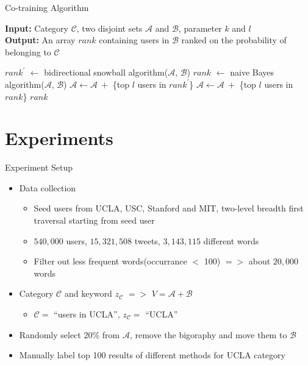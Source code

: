 \documentclass{beamer}
\begin{document}
\begin{frame}{Co-training Algorithm}
\begin{algorithm}[H]
\caption{\textsc{Co-training}}
\textbf{Input: }{Category $\mathcal{C}$, two disjoint sets $\mathcal{A}$ and $\mathcal{B}$, parameter $k$ and $l$}\\
\textbf{Output: }{An array $rank$ containing users in $\mathcal{B}$ ranked on the probability of belonging to $\mathcal{C}$}
\begin{algorithmic}[1]
\REPEAT
\STATE $rank^{\prime}$ $\leftarrow$ bidirectional snowball algorithm($\mathcal{A}$, $\mathcal{B}$)
\STATE $rank$ $\leftarrow$ naive Bayes algorithm($\mathcal{A}$, $\mathcal{B}$)
\STATE $\mathcal{A} \leftarrow \mathcal{A} ~ + $ \{top $l$ users in $rank^{\prime}$\}
\STATE $\mathcal{A} \leftarrow \mathcal{A} ~ + $ \{top $l$ users in $rank$\}
\RETURN $rank$
\end{algorithmic}
\label{alg:cotrain}
\end{algorithm}
\end{frame}

\section{Experiments}
\begin{frame}{Experiment Setup}
\begin{itemize}
\item Data collection
\begin{itemize}
\item Seed users from UCLA, USC, Stanford and MIT, two-level breadth first traversal starting from seed user
\item $540,000$ users, $15,321,508$ tweets, $3,143,115$ different words
\item Filter out less frequent words(occurrance $<$ 100) $=>$ about $20,000$ words
\end{itemize}
\item Category $\mathcal{C}$ and keyword $z_{\mathcal{C}}$ $=>$ $V = \mathcal{A} + \mathcal{B}$
\begin{itemize}
\item $\mathcal{C} = $ ``users in UCLA'', $z_{\mathcal{C}} = $ ``UCLA''
\end{itemize}
\item Randomly select $20\%$ from $\mathcal{A}$, remove the bigoraphy and move them to $\mathcal{B}$
\item Manually label top 100 results of different methods for UCLA category
\end{itemize}
\end{frame}
\end{document}
